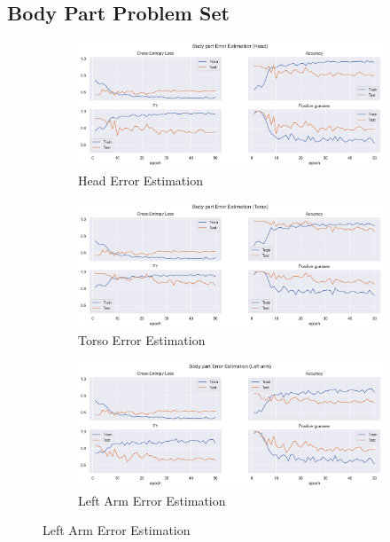 \subsection{Body Part Problem Set}

\begin{figure}[ht]
  \centering
  \begin{subfigure}[b]{0.9\linewidth}
      \centering
      \includegraphics[width=\textwidth]{figures/Results/v1/bp/Head_ErrorEstimation.png}
      \caption{Head Error Estimation}
      \label{fig:head_lb_ee}
  \end{subfigure}
  \hfill
  \begin{subfigure}[b]{0.9\linewidth}
      \centering
      \includegraphics[width=\textwidth]{figures/Results/v1/bp/Torso_ErrorEstimation.png}
      \caption{Torso Error Estimation}
      \label{fig:torso_lb_ee}
  \end{subfigure}
  \hfill
  \begin{subfigure}[b]{0.9\linewidth}
      \centering
      \includegraphics[width=\textwidth]{figures/Results/v1/bp/Left arm_ErrorEstimation.png}
      \caption{Left Arm Error Estimation}
      \label{fig:lear_lb_ee}
  \end{subfigure}
\end{figure}


